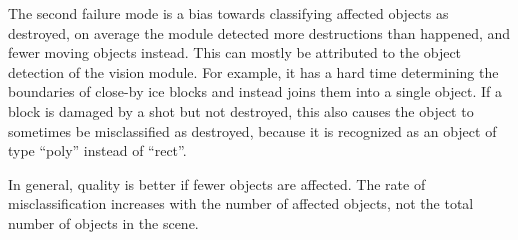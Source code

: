 The second failure mode is a bias towards classifying affected objects as destroyed, on average the module detected more destructions than happened, and fewer moving objects instead.
This can mostly be attributed to the object detection of the vision module.
For example, it has a hard time determining the boundaries of close-by ice blocks and instead joins them into a single object. If a block is damaged by a shot but not destroyed, this also causes the object to sometimes be misclassified as destroyed, because it is recognized as an object of type “poly” instead of “rect”.

In general, quality is better if fewer objects are affected. The rate of misclassification increases with the number of affected objects, not the total number of objects in the scene.


